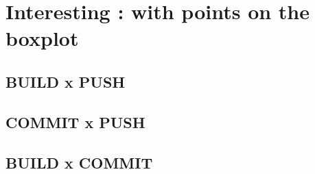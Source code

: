 \section{Interesting : with points on the boxplot}

\subsection{BUILD x PUSH}

\subsection{COMMIT x PUSH}

\subsection{BUILD x COMMIT}
